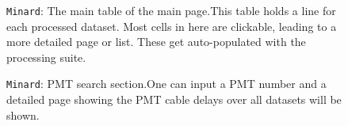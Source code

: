 \documentclass[12pt]{article}
\begin{document}
\begin{figure}
\centering
\noindent{}
  \caption{\centering \texttt{Minard}: The main table of the main page.\hspace{\textwidth}This table holds a line for each processed dataset. Most cells in here are clickable, leading to a more detailed page or list. These get auto-populated with the processing suite.}
  \label{fig:min2}
\end{figure}

\begin{figure}
\centering
\noindent{}
  \caption{\centering \texttt{Minard}: PMT search section.\hspace{\textwidth}One can input a PMT number and a detailed page showing the PMT cable delays over all datasets will be shown.}
  \label{fig:min3}
\end{figure}
\end{document}
